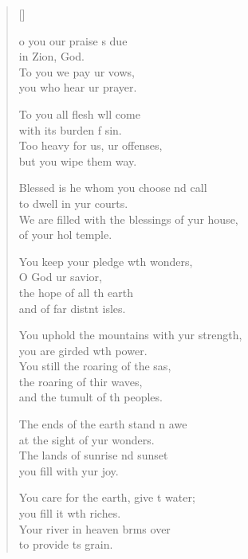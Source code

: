 \settowidth{\versewidth}{We are filled with the blessings of your house, *}
\begin{verse}[\versewidth]
  \begin{patverse}
    o you our praise \pointup{\i}s due\Med\\
in Zion,  God.\\
To you we pay ur vows,\Med\\
you who hear ur prayer.

To you all flesh w\pointup{\i}ll come\Med\\
with its burden f sin.\\
Too heavy for us, ur offenses,\Med\\
but you wipe them way.

Blessed is he whom you choose nd call\Med\\
to dwell in yur courts.\\
We are filled with the blessings of yur house,\Med\\
of your hol temple.

You keep your pledge w\pointup{\i}th wonders,\Med\\
O God ur savior,\\
the hope of all th earth\Med\\
and of far distnt isles.

You uphold the mountains with yur strength,\Med\\
you are girded w\pointup{\i}th power.\\
You still the roaring of the sas,\Flex\\
the roaring of thir waves,\Med\\
and the tumult of th peoples.

The ends of the earth stand \pointup{\i}n awe\Med\\
at the sight of yur wonders.\\
The lands of sunrise nd sunset\Med\\
you fill with yur joy.

You care for the earth, give \pointup{\i}t water;\Med\\
you fill it w\pointup{\i}th riches.\\
Your river in heaven br\pointup{\i}ms over\Med\\
to provide \pointup{\i}ts grain.


\end{patverse}
\end{verse}
